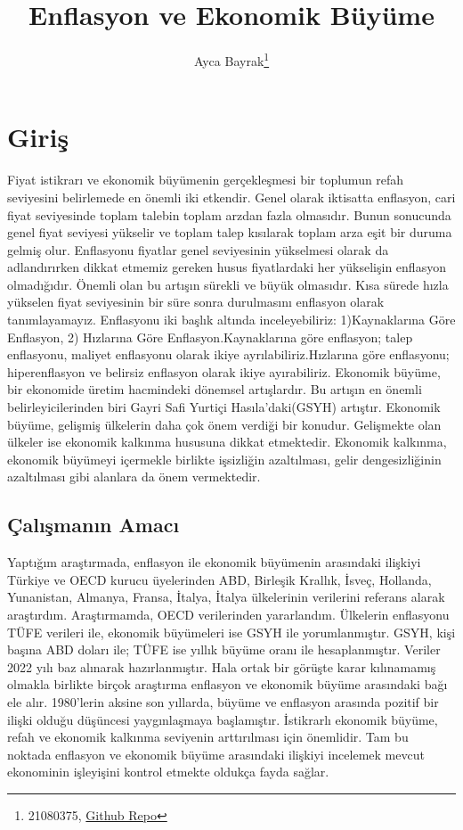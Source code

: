 \documentclass[
  12pt,
]{article}
\title{Enflasyon ve Ekonomik Büyüme}
\author{Ayca Bayrak\footnote{21080375, \href{https://github.com/aycabayrak/aycabayrak_arasinav.git}{Github Repo}}}
\date{}
\begin{document}
\maketitle

\hypertarget{giriux15f}{%
\section{Giriş}\label{giriux15f}}

Fiyat istikrarı ve ekonomik büyümenin gerçekleşmesi bir toplumun refah seviyesini belirlemede en önemli iki etkendir. Genel olarak iktisatta enflasyon, cari fiyat seviyesinde toplam talebin toplam arzdan fazla olmasıdır. Bunun sonucunda genel fiyat seviyesi yükselir ve toplam talep kısılarak toplam arza eşit bir duruma gelmiş olur. Enflasyonu fiyatlar genel seviyesinin yükselmesi olarak da adlandırırken dikkat etmemiz gereken husus fiyatlardaki her yükselişin enflasyon olmadığıdır. Önemli olan bu artışın sürekli ve büyük olmasıdır. Kısa sürede hızla yükselen fiyat seviyesinin bir süre sonra durulmasını enflasyon olarak tanımlayamayız.
Enflasyonu iki başlık altında inceleyebiliriz: 1)Kaynaklarına Göre Enflasyon, 2) Hızlarına Göre Enflasyon.Kaynaklarına göre enflasyon; talep enflasyonu, maliyet enflasyonu olarak ikiye ayrılabiliriz.Hızlarına göre enflasyonu; hiperenflasyon ve belirsiz enflasyon olarak ikiye ayırabiliriz.
Ekonomik büyüme, bir ekonomide üretim hacmindeki dönemsel artışlardır. Bu artışın en önemli belirleyicilerinden biri Gayri Safi Yurtiçi Hasıla'daki(GSYH) artıştır. Ekonomik büyüme, gelişmiş ülkelerin daha çok önem verdiği bir konudur. Gelişmekte olan ülkeler ise ekonomik kalkınma hususuna dikkat etmektedir. Ekonomik kalkınma, ekonomik büyümeyi içermekle birlikte işsizliğin azaltılması, gelir dengesizliğinin azaltılması gibi alanlara da önem vermektedir.

\hypertarget{uxe7alux131ux15fmanux131n-amacux131}{%
\subsection{Çalışmanın Amacı}\label{uxe7alux131ux15fmanux131n-amacux131}}

Yaptığım araştırmada, enflasyon ile ekonomik büyümenin arasındaki ilişkiyi Türkiye ve OECD kurucu üyelerinden ABD, Birleşik Krallık, İsveç, Hollanda, Yunanistan, Almanya, Fransa, İtalya, İtalya ülkelerinin verilerini referans alarak araştırdım. Araştırmamda, OECD verilerinden yararlandım. Ülkelerin enflasyonu TÜFE verileri ile, ekonomik büyümeleri ise GSYH ile yorumlanmıştır. GSYH, kişi başına ABD doları ile; TÜFE ise yıllık büyüme oranı ile hesaplanmıştır. Veriler 2022 yılı baz alınarak hazırlanmıştır.
Hala ortak bir görüşte karar kılınamamış olmakla birlikte birçok araştırma enflasyon ve ekonomik büyüme arasındaki bağı ele alır. 1980'lerin aksine son yıllarda, büyüme ve enflasyon arasında pozitif bir ilişki olduğu düşüncesi yaygınlaşmaya başlamıştır. İstikrarlı ekonomik büyüme, refah ve ekonomik kalkınma seviyenin arttırılması için önemlidir. Tam bu noktada enflasyon ve ekonomik büyüme arasındaki ilişkiyi incelemek mevcut ekonominin işleyişini kontrol etmekte oldukça fayda sağlar.
\end{document}
